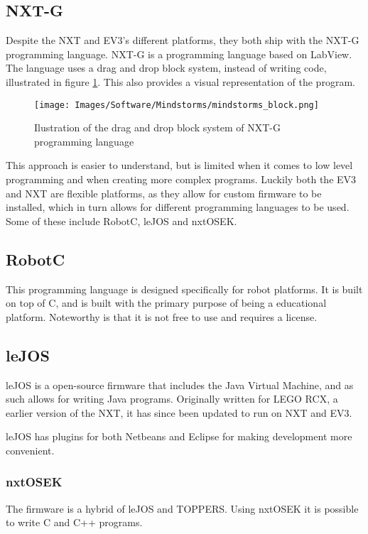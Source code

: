 \subsection*{NXT-G}
Despite the NXT and EV3's different platforms, they both ship with the NXT-G programming language. NXT-G is a programming language based on LabView\cite{LabView}. The language uses a drag and drop block system, instead of writing code, illustrated in figure \ref{NXT-G}. This also provides a visual representation of the program.

\begin{figure}[H]
    \centering
    \texttt{[image: Images/Software/Mindstorms/mindstorms\_block.png]}
    \caption{Ilustration of the drag and drop block system of NXT-G programming language}
    \label{NXT-G}
\end{figure}

This approach is easier to understand, but is limited when it comes to low level programming and when creating more complex programs. Luckily both the EV3 and NXT are flexible platforms, as they allow for custom firmware to be installed, which in turn allows for different programming languages to be used.
Some of these include RobotC\cite{RobotC}, leJOS\cite{leJOS} and nxtOSEK\cite{nxtOSEK}.

\subsection*{RobotC}
This programming language is designed specifically for robot platforms. It is built on top of C, and is built with the primary purpose of being a educational platform. Noteworthy is that it is not free to use and requires a license.

\subsection*{leJOS}
leJOS is a open-source firmware that includes the Java Virtual Machine\cite{Java}, and as such allows for writing Java programs. Originally written for LEGO RCX, a earlier version of the NXT, it has since been updated to run on NXT and EV3.

leJOS has plugins for both Netbeans\cite{Netbeans} and Eclipse\cite{Eclipse} for making development more convenient.

\subsubsection*{nxtOSEK} \label{nxtOSEK}
The firmware is a hybrid of leJOS and TOPPERS\cite{TOPPERS}. Using nxtOSEK it is possible to write C and C++ programs.

